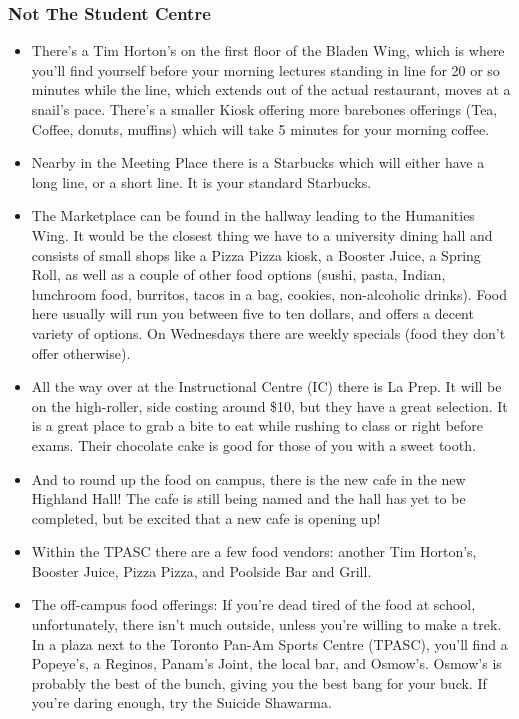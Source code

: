 \documentclass[11pt]{article}
\begin{document}
\subsubsection{Not The Student Centre}
\begin{itemize}
    \item There's a Tim Horton's on the first floor of the Bladen
        Wing, which is where you'll find yourself before your morning lectures
        standing in line for 20 or so minutes while the line, which extends out
        of the actual restaurant, moves at a snail's pace. There's a smaller
        Kiosk offering more barebones offerings (Tea, Coffee, donuts, muffins)
        which will take 5 minutes for your morning coffee.
    \item Nearby in the Meeting Place there is a Starbucks which will
        either have a long line, or a short line. It is your standard Starbucks.
    \item The Marketplace can be found in the hallway leading to the
        Humanities Wing. It would be the closest thing we have to a university
        dining hall and consists of small shops like a Pizza Pizza kiosk,
        a Booster Juice, a Spring Roll, as well as a couple of other food
        options (sushi, pasta, Indian, lunchroom food, burritos, tacos in a
        bag, cookies, non-alcoholic drinks). Food here usually will run you
        between five to ten dollars, and offers a decent variety of options. On
        Wednesdays there are weekly specials (food they don't offer otherwise).
    \item All the way over at the Instructional Centre (IC) there is La
        Prep. It will be on the high-roller, side costing around \$10, but they
        have a great selection. It is a great place to grab a bite to eat while
        rushing to class or right before exams. Their chocolate cake is good for
        those of you with a sweet tooth.
    \item And to round up the food on campus, there is the new cafe in
        the new Highland Hall! The cafe is still being named and the hall has
        yet to be completed, but be excited that a new cafe is opening up!
    \item Within the TPASC there are a few food vendors: another Tim
        Horton's, Booster Juice, Pizza Pizza, and Poolside Bar and Grill.
    \item The off-campus food offerings: If you're dead tired of the
        food at school, unfortunately, there isn't much outside, unless you're
        willing to make a trek. In a plaza next to the Toronto Pan-Am Sports
        Centre (TPASC), you'll find a Popeye's, a Reginos, Panam's Joint, the
        local bar, and Osmow's. Osmow's is probably the best of the bunch,
        giving you the best bang for your buck. If you're daring enough, try the
        Suicide Shawarma.
\end{itemize}
\end{document}
